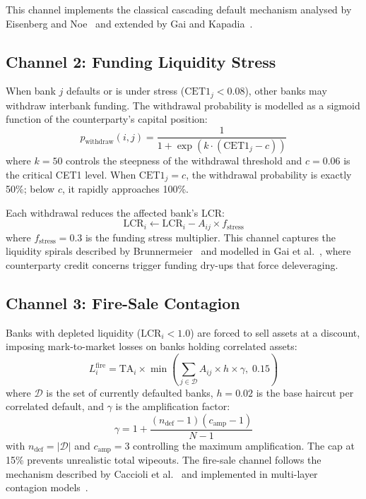 This channel implements the classical cascading default mechanism analysed by Eisenberg and Noe~\cite{elliott2014financial} and extended by Gai and Kapadia~\cite{gai2010contagion}.

\subsection{Channel 2: Funding Liquidity Stress}

When bank $j$ defaults or is under stress ($\text{CET1}_j < 0.08$), other banks may withdraw interbank funding. The withdrawal probability is modelled as a sigmoid function of the counterparty's capital position:
\begin{equation}
    p_{\text{withdraw}}(i, j) = \frac{1}{1 + \exp\!\left(k \cdot (\text{CET1}_j - c)\right)}
    \label{eq:funding-prob}
\end{equation}
where $k = 50$ controls the steepness of the withdrawal threshold and $c = 0.06$ is the critical CET1 level. When $\text{CET1}_j = c$, the withdrawal probability is exactly 50\%; below $c$, it rapidly approaches 100\%.

Each withdrawal reduces the affected bank's LCR:
\begin{equation}
    \text{LCR}_i \gets \text{LCR}_i - A_{ij} \times f_{\text{stress}}
    \label{eq:funding-impact}
\end{equation}
where $f_{\text{stress}} = 0.3$ is the funding stress multiplier. This channel captures the liquidity spirals described by Brunnermeier~\cite{brunnermeier2009market} and modelled in Gai et al.~\cite{gai2010contagion}, where counterparty credit concerns trigger funding dry-ups that force deleveraging.

\subsection{Channel 3: Fire-Sale Contagion}

Banks with depleted liquidity ($\text{LCR}_i < 1.0$) are forced to sell assets at a discount, imposing mark-to-market losses on banks holding correlated assets:
\begin{equation}
    L_i^{\text{fire}} = \text{TA}_i \times \min\!\left(\sum_{j \in \mathcal{D}} A_{ij} \times h \times \gamma,\; 0.15\right)
    \label{eq:firesale-loss}
\end{equation}
where $\mathcal{D}$ is the set of currently defaulted banks, $h = 0.02$ is the base haircut per correlated default, and $\gamma$ is the amplification factor:
\begin{equation}
    \gamma = 1 + \frac{(n_{\text{def}} - 1)(c_{\text{amp}} - 1)}{N - 1}
    \label{eq:amplification}
\end{equation}
with $n_{\text{def}} = |\mathcal{D}|$ and $c_{\text{amp}} = 3$ controlling the maximum amplification. The cap at 15\% prevents unrealistic total wipeouts. The fire-sale channel follows the mechanism described by Caccioli et al.~\cite{caccioli2015overlapping} and implemented in multi-layer contagion models~\cite{poledna2015economics,bardoscia2017distress}.

